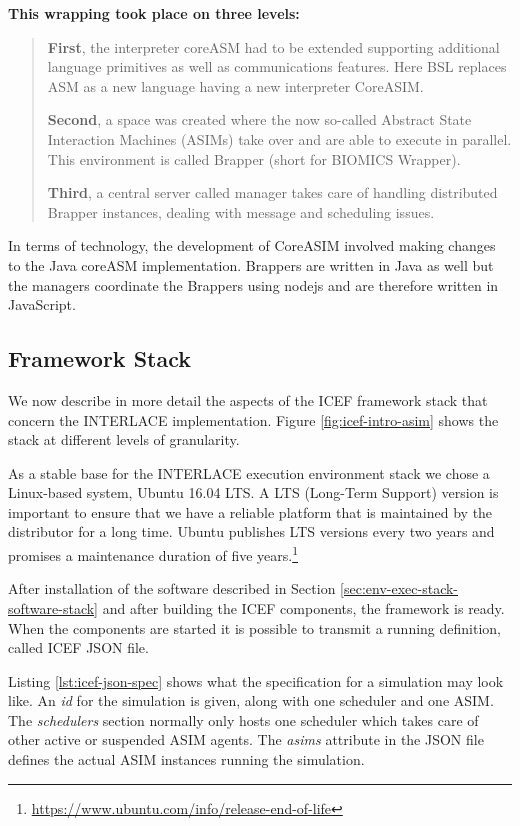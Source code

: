 \textbf{This wrapping took place on three levels:}
\begin{quote}
\small
\textbf{First}, the interpreter coreASM had to be extended supporting additional language primitives as well as communications features. Here BSL replaces ASM as a new language having a new interpreter CoreASIM.

\smallskip
\textbf{Second}, a space was created where the now so-called Abstract State Interaction Machines (ASIMs) take over and are able to execute in parallel. This environment is called Brapper (short for BIOMICS Wrapper).

\smallskip
\textbf{Third}, a central server called manager takes care of handling distributed Brapper instances, dealing with message and scheduling issues.
\end{quote}
In terms of technology, the development of CoreASIM involved making changes to the Java coreASM implementation. Brappers are written in Java as well but the managers coordinate the Brappers using nodejs and are therefore written in JavaScript.

\subsection{Framework Stack}
We now describe in more detail the aspects of the ICEF framework stack that concern the INTERLACE implementation. Figure \ref{fig:icef-intro-asim} shows the stack at different levels of granularity.

As a stable base for the INTERLACE execution environment stack we chose a Linux-based system, Ubuntu 16.04 LTS. A LTS (Long-Term Support) version is important to ensure that we have a reliable platform that is maintained by the distributor for a long time. Ubuntu publishes LTS versions every two years and promises a maintenance duration of five years.\footnote{\url{https://www.ubuntu.com/info/release-end-of-life}}

After installation of the software described in Section \ref{sec:env-exec-stack-software-stack} and after building the ICEF components, the framework is ready. When the components are started it is possible to transmit a running definition, called ICEF JSON file.

Listing \ref{lst:icef-json-spec} shows what the specification for a simulation may look like. An \textit{id} for the simulation is given, along with one scheduler and one ASIM. The \textit{schedulers} section normally only hosts one scheduler which takes care of other active or suspended ASIM agents. The \textit{asims} attribute in the JSON file defines the actual ASIM instances running the simulation.

